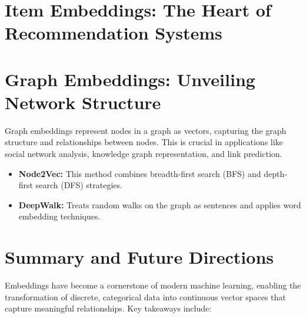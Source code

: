  \section{Item Embeddings: The Heart of Recommendation Systems}

\section{Graph Embeddings: Unveiling Network Structure}

Graph embeddings represent nodes in a graph as vectors, capturing the graph structure and relationships between nodes. This is crucial in applications like social network analysis, knowledge graph representation, and link prediction.

\begin{itemize}[noitemsep]  
 \item \textbf{Node2Vec:} This method combines breadth-first search (BFS) and depth-first search (DFS) strategies.

 \item \textbf{DeepWalk:} Treats random walks on the graph as sentences and applies word embedding techniques.
\end{itemize}

\section{Summary and Future Directions}

\noindent
Embeddings have become a cornerstone of modern machine learning, enabling the transformation of discrete, categorical data into continuous vector spaces that capture meaningful relationships. Key takeaways include:

